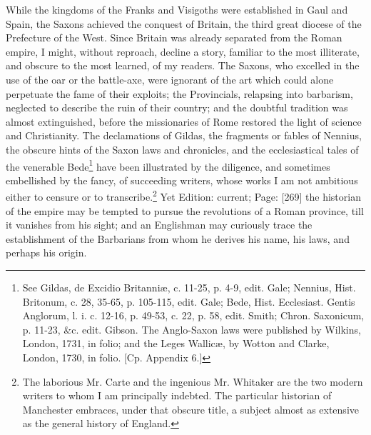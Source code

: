 While the kingdoms of the Franks and Visigoths were established in Gaul and Spain, the Saxons achieved the conquest of Britain, the third great diocese of the Prefecture of the West. Since Britain was already separated from the Roman empire, I might, without reproach, decline a story, familiar to the most illiterate, and obscure to the most learned, of my readers. The Saxons, who excelled in the use of the oar or the battle-axe, were ignorant of the art which could alone perpetuate the fame of their exploits; the Provincials, relapsing into barbarism, neglected to describe the ruin of their country; and the doubtful tradition was almost extinguished, before the missionaries of Rome restored the light of science and Christianity. The declamations of Gildas, the fragments or fables of Nennius, the obscure hints of the Saxon laws and chronicles, and the ecclesiastical tales of the venerable Bede\footnote{See Gildas, de Excidio Britanniæ, c. 11-25, p. 4-9, edit. Gale; Nennius, Hist. Britonum, c. 28, 35-65, p. 105-115, edit. Gale; Bede, Hist. Ecclesiast. Gentis Anglorum, l. i. c. 12-16, p. 49-53, c. 22, p. 58, edit. Smith; Chron. Saxonicum, p. 11-23, \&c. edit. Gibson. The Anglo-Saxon laws were published by Wilkins, London, 1731, in folio; and the Leges Wallicæ, by Wotton and Clarke, London, 1730, in folio. [Cp. Appendix 6.]} have been illustrated by the diligence, and sometimes embellished by the fancy, of succeeding writers, whose works I am not ambitious either to censure or to transcribe.\footnote{The laborious Mr. Carte and the ingenious Mr. Whitaker are the two modern writers to whom I am principally indebted. The particular historian of Manchester embraces, under that obscure title, a subject almost as extensive as the general history of England.} Yet Edition: current; Page: [269] the historian of the empire may be tempted to pursue the revolutions of a Roman province, till it vanishes from his sight; and an Englishman may curiously trace the establishment of the Barbarians from whom he derives his name, his laws, and perhaps his origin.

